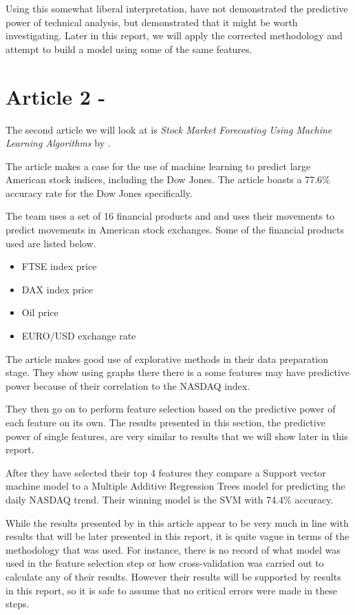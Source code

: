\documentclass{report}
\begin{document}
Using this somewhat liberal interpretation, \citet{kara2011predicting} have not demonstrated the predictive power of technical analysis, but demonstrated that it might be worth investigating. Later in this report, we will apply the corrected methodology and attempt to build a model using some of the same features.

\section{Article 2 - \citet{shen2012stock}}

The second article we will look at is \textit{Stock Market Forecasting Using Machine Learning Algorithms} by \citet{shen2012stock}.

The article makes a case for the use of machine learning to predict large American stock indices, including the Dow Jones. The article boasts a 77.6\% accuracy rate for the Dow Jones specifically. 

The team uses a set of 16 financial products and and uses their movements to predict movements in American stock exchanges. Some of the financial products used are listed below.

\begin{itemize}[noitemsep]
  \item FTSE index price
  \item DAX index price
  \item Oil price
  \item EURO/USD exchange rate
\end{itemize}

The article makes good use of explorative methods in their data preparation stage. They show using graphs there there is a some features may have predictive power because of their correlation to the NASDAQ index. 

They then go on to perform feature selection based on the predictive power of each feature on its own. The results presented in this section, the predictive power of single features, are very similar to results that we will show later in this report. 

After they have selected their top 4 features they compare a Support vector machine model to a Multiple Additive Regression Trees model for predicting the daily NASDAQ trend. Their winning model is the SVM with 74.4\% accuracy. 

While the results presented by \citet{shen2012stock} in this article appear to be very much in line with results that will be later presented in this report, it is quite vague in terms of the methodology that was used. For instance, there is no record of what model was used in the feature selection step or how cross-validation was carried out to calculate any of their results. However their results will be supported by results in this report, so it is safe to assume that no critical errors were made in these steps.
\end{document}
